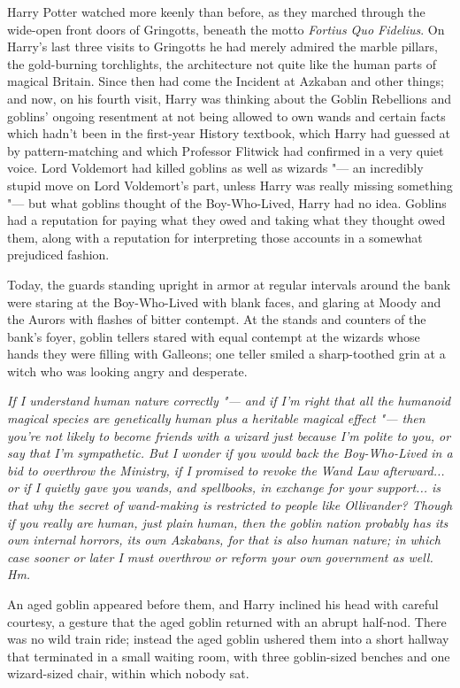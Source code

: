 Harry Potter watched more keenly than before, as they marched through
the wide-open front doors of Gringotts, beneath the motto \emph{Fortius
Quo Fidelius}. On Harry's last three visits to Gringotts he had merely
admired the marble pillars, the gold-burning torchlights, the
architecture not quite like the human parts of magical Britain. Since
then had come the Incident at Azkaban and other things; and now, on his
fourth visit, Harry was thinking about the Goblin Rebellions and
goblins' ongoing resentment at not being allowed to own wands and
certain facts which hadn't been in the first-year History textbook,
which Harry had guessed at by pattern-matching and which Professor
Flitwick had confirmed in a very quiet voice. Lord Voldemort had killed
goblins as well as wizards "--- an incredibly stupid move on Lord
Voldemort's part, unless Harry was really missing something "--- but what
goblins thought of the Boy-Who-Lived, Harry had no idea. Goblins had a
reputation for paying what they owed and taking what they thought owed
them, along with a reputation for interpreting those accounts in a
somewhat prejudiced fashion.

Today, the guards standing upright in armor at regular intervals around
the bank were staring at the Boy-Who-Lived with blank faces, and glaring
at Moody and the Aurors with flashes of bitter contempt. At the stands
and counters of the bank's foyer, goblin tellers stared with equal
contempt at the wizards whose hands they were filling with Galleons; one
teller smiled a sharp-toothed grin at a witch who was looking angry and
desperate.

\emph{If I understand human nature correctly "--- and if I'm right that all
the humanoid magical species are genetically human plus a heritable
magical effect "--- then you're not likely to become friends with a wizard
just because I'm polite to you, or say that I'm sympathetic. But}
\emph{I wonder if you would back the Boy-Who-Lived in a bid to overthrow
the Ministry, if I promised to revoke the Wand Law afterward... or
if I quietly gave you wands, and spellbooks, in exchange for your
support... is that why the secret of wand-making is restricted to
people like Ollivander? Though if you really are human, just plain
human, then the goblin nation probably has its own internal horrors, its
own Azkabans, for that is also human nature; in which case sooner or
later I must overthrow or reform your own government as well. Hm.}

An aged goblin appeared before them, and Harry inclined his head with
careful courtesy, a gesture that the aged goblin returned with an abrupt
half-nod. There was no wild train ride; instead the aged goblin ushered
them into a short hallway that terminated in a small waiting room, with
three goblin-sized benches and one wizard-sized chair, within which
nobody sat.

